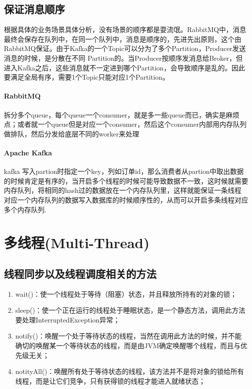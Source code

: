 \documentclass[../../../interview-questions.tex]{subfiles}
\begin{document}
\subsection{保证消息顺序}

根据具体的业务场景具体分析，没有场景的顺序都是耍流氓。RabbitMQ中，消息最终会保存在队列中，在同一个队列中，消息是顺序的，先进先出原则，这个由RabbitMQ保证。由于Kafka的一个Topic可以分为了多个Partition，Producer发送消息的时候，是分散在不同 Partition的。当Producer按顺序发消息给Broker，但进入Kafka之后，这些消息就不一定进到哪个Partition，会导致顺序是乱的。因此要满足全局有序，需要1个Topic只能对应1个Partition。

\paragraph{RabbitMQ}拆分多个queue，每个queue一个consumer，就是多一些queue而已，确实是麻烦点；或者就一个queue但是对应一个consumer，然后这个consumer内部用内存队列做排队，然后分发给底层不同的worker来处理

\paragraph{Apache Kafka}kafka 写入partion时指定一个key，列如订单id，那么消费者从partion中取出数据的时候肯定是有序的，当开启多个线程的时候可能导致数据不一致，这时候就需要内存队列，将相同的hash过的数据放在一个内存队列里，这样就能保证一条线程对应一个内存队列的数据写入数据库的时候顺序性的，从而可以开启多条线程对应多个内存队列.

\section{多线程(Multi-Thread)}

\subsection{线程同步以及线程调度相关的方法}

\begin{enumerate}
\item {wait()：使一个线程处于等待（阻塞）状态，并且释放所持有的对象的锁；}
\item{sleep()：使一个正在运行的线程处于睡眠状态，是一个静态方法，调用此方法要处理InterruptedException异常；}
\item{notify()：唤醒一个处于等待状态的线程，当然在调用此方法的时候，并不能确切的唤醒某一个等待状态的线程，而是由JVM确定唤醒哪个线程，而且与优先级无关；}
\item{notityAll()：唤醒所有处于等待状态的线程，该方法并不是将对象的锁给所有线程，而是让它们竞争，只有获得锁的线程才能进入就绪状态；}
\end{enumerate}
\end{document}
